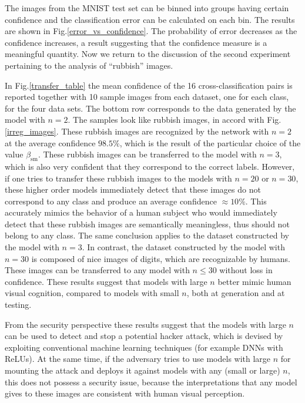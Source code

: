 The images from the MNIST test set can be binned into groups having certain confidence and the classification error can be calculated on each bin. The results are shown in Fig.\ref{error_vs_confidence}. The probability of error decreases as the confidence increases, a result suggesting that the confidence measure is a meaningful quantity. Now we return to the discussion of the second experiment pertaining to the analysis of ``rubbish'' images.

In Fig.\ref{transfer_table} the mean confidence of the 16 cross-classification pairs is reported together with 10 sample images from each dataset, one for each class, for the four data sets. The bottom row corresponds to the data generated by the model with $n=2$. The samples look like rubbish images, in accord with Fig.\ref{irreg_images}. These rubbish images are recognized by the network with $n=2$ at the average confidence $98.5\%$, which is the result of the particular choice of the value $\beta_{\text{sm}}$. These rubbish images can be transferred to the model with $n=3$, which is also very confident that they correspond to the correct labels. However, if one tries to transfer these rubbish images to the models with $n=20$ or $n=30$, these higher order models immediately detect that these images do not correspond to any class and produce an average confidence $\approx 10\%$. This accurately mimics the behavior of a human subject who would immediately detect that these rubbish images are semantically meaningless, thus should not belong to any class.  The same conclusion applies to the dataset constructed by the model with $n=3$. In contrast, the dataset constructed by the model with $n=30$ is composed of nice images of digits, which are recognizable by humans. These images can be transferred to any model with $n\leq 30$ without loss in confidence. These results suggest that models with large $n$ better mimic human visual cognition, compared to models with small $n$, both at generation and at testing. 

From the security perspective these results suggest that the models with large $n$ can be used to detect and stop a potential hacker attack, which is devised by exploiting conventional machine learning techniques (for example DNNs with ReLUs). At the same time, if the adversary tries to use models with large $n$ for mounting the attack and deploys it against models with any (small or large) $n$, this does not possess a security issue, because the interpretations that any model gives to these images are consistent with human visual perception. 

